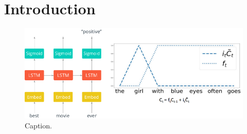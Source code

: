 \section{Introduction}
\lipsum[1-6]

\begin{figure}
\includegraphics[width=\linewidth]{Paper_figures/Figure1_intro.png}
\caption{Caption.}
\end{figure}
